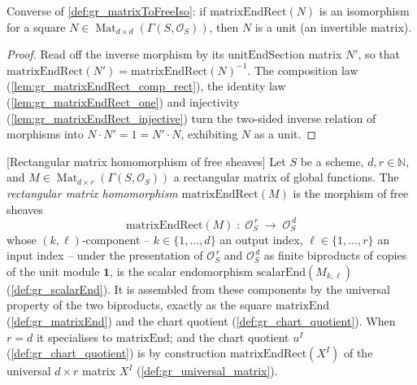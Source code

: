 \begin{lemma}
  \label{lem:gr_isUnit_of_isIso_matrixEndRect}
  Converse of \cref{def:gr_matrixToFreeIso}: if \(\mathrm{matrixEndRect}(N)\) is an
  isomorphism for a square \(N \in \operatorname{Mat}_{d\times d}(\Gamma(S, \mathcal{O}_S))\),
  then \(N\) is a unit (an invertible matrix).
\end{lemma}
\begin{proof}
  Read off the inverse morphism by its \(\mathrm{unitEndSection}\) matrix \(N'\), so that
  \(\mathrm{matrixEndRect}(N') = \mathrm{matrixEndRect}(N)^{-1}\). The composition law
  (\cref{lem:gr_matrixEndRect_comp_rect}), the identity law
  (\cref{lem:gr_matrixEndRect_one}) and injectivity (\cref{lem:gr_matrixEndRect_injective})
  turn the two-sided inverse relation of morphisms into \(N \cdot N' = 1 = N' \cdot N\),
  exhibiting \(N\) as a unit.
\end{proof}

\begin{definition}

[Rectangular matrix homomorphism of free sheaves]
  \label{def:gr_matrixEndRect}
  Let \(S\) be a scheme, \(d, r \in \mathbb{N}\), and
  \(M \in \operatorname{Mat}_{d \times r}(\Gamma(S, \mathcal{O}_S))\) a rectangular matrix
  of global functions. The \emph{rectangular matrix homomorphism}
  \(\mathrm{matrixEndRect}(M)\) is the morphism of free sheaves
  \[
    \mathrm{matrixEndRect}(M) \;:\; \mathcal{O}_S^{\,r}
      \;\longrightarrow\; \mathcal{O}_S^{\,d}
  \]
  whose \((k,\ell)\)-component -- \(k \in \{1,\dots,d\}\) an output index,
  \(\ell \in \{1,\dots,r\}\) an input index -- under the presentation of
  \(\mathcal{O}_S^{\,r}\) and \(\mathcal{O}_S^{\,d}\) as finite biproducts of copies of the
  unit module \(\mathbf 1\), is the scalar endomorphism \(\mathrm{scalarEnd}(M_{k,\ell})\)
  (\cref{def:gr_scalarEnd}). It is assembled from these components by the universal property
  of the two biproducts, exactly as the square \(\mathrm{matrixEnd}\)
  (\cref{def:gr_matrixEnd}) and the chart quotient (\cref{def:gr_chart_quotient}). When
  \(r = d\) it specialises to \(\mathrm{matrixEnd}\); and the chart quotient \(u^I\)
  (\cref{def:gr_chart_quotient}) is by construction \(\mathrm{matrixEndRect}(X^I)\) of the
  universal \(d \times r\) matrix \(X^I\) (\cref{def:gr_universal_matrix}).
\end{definition}

